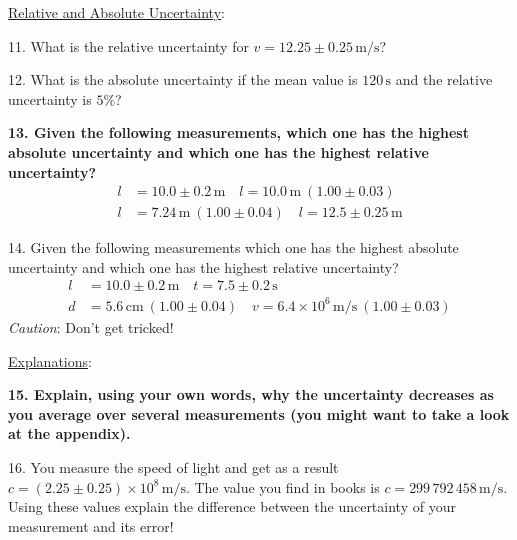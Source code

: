 \noindent \underline{Relative and Absolute Uncertainty}:\myskip

11. What is the relative uncertainty for $v = 12.25 \pm 0.25\,\mathrm{m/s}$?\myskip

12. What is the absolute uncertainty if the mean value is $120\,\mathrm{s}$ and the relative uncertainty is $5\%$?\myskip

{\bf{13. Given the following measurements, which one has the highest absolute uncertainty and which one has the highest relative uncertainty?}}
\begin{align*}
    l &= 10.0 \pm 0.2\,\mathrm{m} \quad   l = 10.0\,\mathrm{m}\: (1.00 \pm 0.03)   \\ 
    l &= 7.24\,\mathrm{m}\: (1.00 \pm 0.04) \quad l = 12.5 \pm 0.25\,\mathrm{m}   
\end{align*}

14. Given the following measurements which one has the highest absolute uncertainty and which one has the highest relative uncertainty?\myskip
\begin{align*}
    l &= 10.0\pm 0.2\,\mathrm{m} \quad t = 7.5\pm 0.2\,\mathrm{s} \\
    d &= 5.6\,\mathrm{cm}\:(1.00\pm 0.04) \quad v = 6.4\times 10^6\,\mathrm{m/s}\:(1.00\pm 0.03)
\end{align*}
\emph{Caution}: Don't get tricked!\myskip

\noindent \underline{Explanations}:\myskip

{\bf{15. Explain, using your own words, why the uncertainty decreases as you average over several measurements (you might want to take a look at the appendix).}} \myskip


16. You measure the speed of light and get as a result $c = (2.25 \pm 0.25)\times 10^8\,\mathrm{m/s}$. The value you find in books is $c = 299\, 792\, 458\,\mathrm{m/s}$.  Using these values explain the difference between the uncertainty of your measurement and its error!

